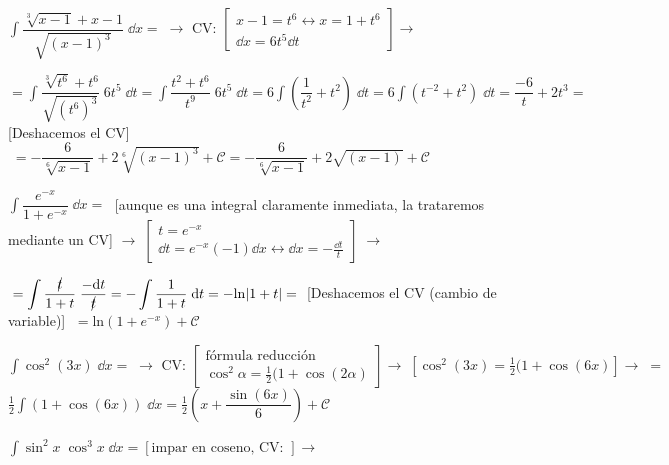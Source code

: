 {\begin{ejem}
 
$ \displaystyle \int \dfrac {\sqrt[3]{x-1}+x-1}{\sqrt{(x-1)^3}} \; \dd x  =\; \to \text { CV: }  
\left[ \begin{matrix} x-1=t^6 \leftrightarrow x=1+t^6 \\ \dd x = 6 t^5 \dd t  \end{matrix} \right] \to   $

$ = \displaystyle \int \dfrac {\sqrt[3]{t^6} + t^6}{\sqrt{(t^6)^3}} \; 6t^5\; \dd t = \displaystyle \int \dfrac {t^2+t^6}{t^9} \; 6t^5\; \dd t= 6 \int \left( \dfrac {1}{t^2} + t^2   \right) \; \dd t =  6 \int  (t^{-2} + t^2)\; \dd t= \dfrac {-6}{t}+2t^3=\; $ [Deshacemos el CV] $\; = -\dfrac {6}{\sqrt[6]{x-1}}+ 2 \sqrt[6]{(x-1)^3}+\mathcal C =  -\dfrac {6}{\sqrt[6]{x-1}}+ 2 \sqrt{(x-1)}+\mathcal C$
	
\end{ejem}


\begin{ejem}

$ \displaystyle \int \dfrac {e^{-x}}{1+e^{-x}}\; \dd x =\; $ [aunque es una integral claramente inmediata, la trataremos mediante un CV] $ \to \; \left[ \begin{matrix} t=e^{-x} \\ \dd t = e^{-x}(-1)\dd x \leftrightarrow  \dd x= -\frac {\dd t}{t} \end{matrix} \right]\; \to  $

$\; = \displaystyle \int \dfrac {\cancel{t}}{1+t} \; \dfrac {- \dd t}{\cancel{t}} = - \int \dfrac {1}{1+t} \; \dd t = - \mathrm{ln}|1+t| =\; $ [Deshacemos el CV (cambio de variable)] $\; = \mathrm{ln} (1+e^{-x}) + \mathcal C$

\end{ejem}

\begin{ejem}
$\displaystyle \int \cos^2 (3x) \; \dd x = \;\to  \text { CV: } 	\left[ \begin{matrix} \text{fórmula reducción} \\ \cos^2 \alpha = \frac 1 2 (1 + \cos (2\alpha) \end{matrix} \right] \to  \; [ \cos^2 (3x) = \frac 1 2 (1 + \cos (6x)] \to \; = $
$\frac 1 2  \int (1 + \cos (6x)) \; \dd x = \frac 1 2 \left( x + \dfrac {\sin (6x)}{6}  \right) + \mathcal C$
\end{ejem}

\begin{ejem}
$\displaystyle \int \sin^2 x \; \cos^3 x \; \dd x = [ \text {impar en coseno,  CV: } ] \to $


\end{ejem}}
